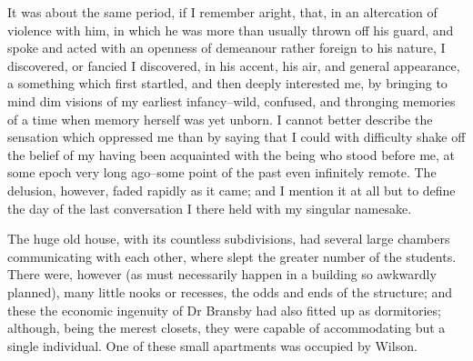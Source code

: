 \documentclass[12pt]{book}
\begin{document}
     It was about the same period, if I remember aright, that, in
an altercation of violence with him, in which he was more than
usually thrown off his guard, and spoke and acted with an openness
of demeanour rather foreign to his nature, I discovered, or fancied
I discovered, in his accent, his air, and general appearance, a
something which first startled, and then deeply interested me, by
bringing to mind dim visions of my earliest infancy--wild, 
confused, and thronging memories of a time when memory herself was
yet unborn.  I cannot better describe the sensation which oppressed
me than by saying that I could with difficulty shake off the belief
of my having been acquainted with the being who stood before me, at
some epoch very long ago--some point of the past even infinitely
remote.  The delusion, however, faded rapidly as it came; and I
mention it at all but to define the day of the last conversation I
there held with my singular namesake.

     The huge old house, with its countless subdivisions, had
several large chambers communicating with each other, where slept
the greater number of the students.  There were, however (as must
necessarily happen in a building so awkwardly planned), many little
nooks or recesses, the odds and ends of the structure; and these
the economic ingenuity of Dr Bransby had also fitted up as
dormitories; although, being the merest closets, they were capable
of accommodating but a single individual.  One of these small
apartments was occupied by Wilson.
\end{document}
